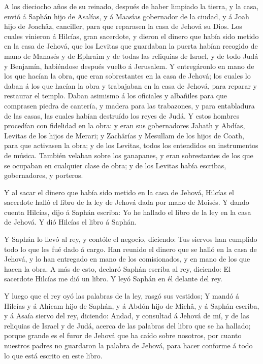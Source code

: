  A los dieciocho años de su reinado, después de haber
limpiado la tierra, y la casa, envió á Saphán hijo de Asalías, y á
Maasías gobernador de la ciudad, y á Joah hijo de Joachâz, canciller,
para que reparasen la casa de Jehová su Dios.  Los cuales
vinieron á Hilcías, gran sacerdote, y dieron el dinero que había sido
metido en la casa de Jehová, que los Levitas que guardaban la puerta
habían recogido de mano de Manasés y de Ephraim y de todas las reliquias
de Israel, y de todo Judá y Benjamín, habiéndose después vuelto á
Jerusalem.  Y entregáronlo en mano de los que hacían la
obra, que eran sobrestantes en la casa de Jehová; los cuales lo daban á
los que hacían la obra y trabajaban en la casa de Jehová, para reparar y
restaurar el templo.  Daban asimismo á los oficiales y
albañiles para que comprasen piedra de cantería, y madera para las
trabazones, y para entabladura de las casas, las cuales habían destruído
los reyes de Judá.  Y estos hombres procedían con fidelidad
en la obra: y eran sus gobernadores Jahath y Abdías, Levitas de los
hijos de Merari; y Zachârías y Mesullam de los hijos de Coath, para que
activasen la obra; y de los Levitas, todos los entendidos en
instrumentos de música.  También velaban sobre los
ganapanes, y eran sobrestantes de los que se ocupaban en cualquier clase
de obra; y de los Levitas había escribas, gobernadores, y porteros.

 Y al sacar el dinero que había sido metido en la casa de
Jehová, Hilcías el sacerdote halló el libro de la ley de Jehová dada por
mano de Moisés.  Y dando cuenta Hilcías, dijo á Saphán
escriba: Yo he hallado el libro de la ley en la casa de Jehová. Y dió
Hilcías el libro á Saphán.

 Y Saphán lo llevó al rey, y contóle el negocio, diciendo:
Tus siervos han cumplido todo lo que les fué dado á cargo. 
Han reunido el dinero que se halló en la casa de Jehová, y lo han
entregado en mano de los comisionados, y en mano de los que hacen la
obra.  A más de esto, declaró Saphán escriba al rey,
diciendo: El sacerdote Hilcías me dió un libro. Y leyó Saphán en él
delante del rey.

 Y luego que el rey oyó las palabras de la ley, rasgó sus
vestidos;  Y mandó á Hilcías y á Ahicam hijo de Saphán, y á
Abdón hijo de Michâ, y á Saphán escriba, y á Asaía siervo del rey,
diciendo:  Andad, y consultad á Jehová de mí, y de las
reliquias de Israel y de Judá, acerca de las palabras del libro que se
ha hallado; porque grande es el furor de Jehová que ha caído sobre
nosotros, por cuanto nuestros padres no guardaron la palabra de Jehová,
para hacer conforme á todo lo que está escrito en este libro.

